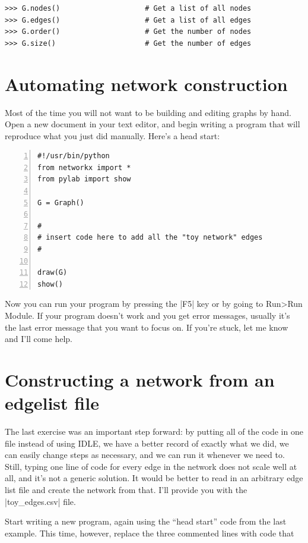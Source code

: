 \documentclass{article}
\begin{document}
\begin{Verbatim}[samepage=true]
>>> G.nodes()                    # Get a list of all nodes
>>> G.edges()                    # Get a list of all edges
>>> G.order()                    # Get the number of nodes
>>> G.size()                     # Get the number of edges
\end{Verbatim}

\section{Automating network construction}
Most of the time you will not want to be building and editing graphs by hand.  Open a new document in your text editor, and begin writing a program that will reproduce what you just did manually.  Here's a head start:

\begin{Verbatim}[numbers = left, samepage=true]
#!/usr/bin/python
from networkx import *
from pylab import show

G = Graph()

#
# insert code here to add all the "toy network" edges
#

draw(G)
show()
\end{Verbatim}

Now you can run your program by pressing the |F5| key or by going to Run\textgreater Run Module.  If your program doesn't work and you get error
 messages, usually it's the last error message that you want to focus on.  If you're stuck, let me know and I'll come help.

\section{Constructing a network from an edgelist file}
\label{edges_to_net}
The last exercise was an important step forward: by putting all of the code in one file instead of using IDLE, we have a better record of exactly what
we did, we can easily change steps as necessary, and we can run it whenever we need to.  Still, typing one line of code for every edge in the network
does not scale well at all, and it's not a generic solution.  It would be better to read in an arbitrary edge list file and create the network from that.
I'll provide you with the |toy_edges.csv| file.

Start writing a new program, again using the ``head start'' code from the last example.  This time, however, replace the three commented lines with 
code that
\end{document}

